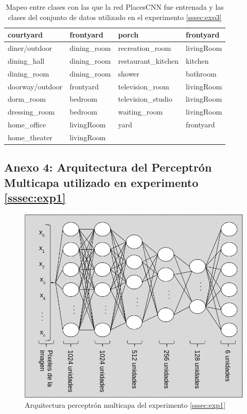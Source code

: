 \begin{table}[h!]
\begin{tabular}{||l|l||l|l||}
		courtyard &    frontyard &               porch &   frontyard \\
		\midrule
		diner/outdoor &  dining\_room &     recreation\_room &  livingRoom \\
		\midrule
		dining\_hall &  dining\_room &  restaurant\_kitchen &     kitchen \\
		\midrule
		dining\_room &  dining\_room &              shower &    bathroom \\
		\midrule
		doorway/outdoor &    frontyard &     television\_room &  livingRoom \\
		\midrule
		dorm\_room &      bedroom &   television\_studio &  livingRoom \\
		\midrule
		dressing\_room &      bedroom &        waiting\_room &  livingRoom \\
		\midrule
		home\_office &   livingRoom &                yard &   frontyard \\
		\midrule
		home\_theater &  livingRoom & & \\
		\bottomrule
	\end{tabular}
	\caption{Mapeo entre clases con las que la red PlacesCNN fue entrenada y las clases del conjunto de datos utilizado en el experimento \ref{sssec:exp3}}
\label{anexo:exp3:mapping}
\end{table}



\subsection{Anexo 4: Arquitectura del Perceptrón Multicapa utilizado en experimento \ref{sssec:exp1}}\label{ssec:anexo4}
\begin{figure}[h!]
\centering
\includegraphics[width=0.7\linewidth]{images/architecture_exp1}
\caption{Arquitectura perceptrón multicapa del experimento \ref{sssec:exp1}}
\label{fig:architectureexp1}
\end{figure}


